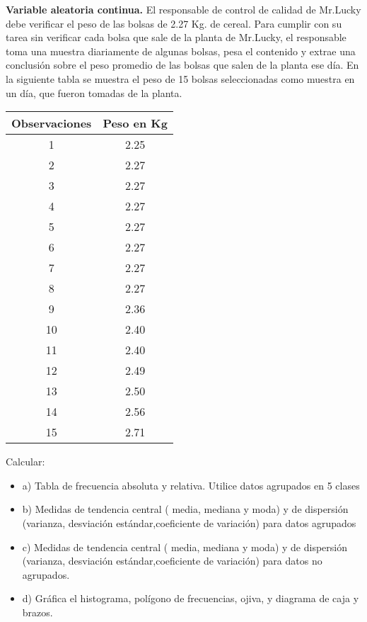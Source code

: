 \documentclass{../oxmathproblems}
\begin{document}
\begin{questions}

\miquestion \textbf{Variable aleatoria continua.}
El responsable de control de calidad de Mr.Lucky debe verificar el peso de las bolsas de 2.27 Kg. de cereal. Para cumplir con su tarea sin verificar cada bolsa que sale de la planta de Mr.Lucky, el responsable toma una muestra diariamente de algunas bolsas, pesa el contenido y extrae una conclusión sobre el peso promedio de las bolsas que salen de la planta ese día. 
En la siguiente tabla se muestra el peso de 15 bolsas seleccionadas como muestra en un día, que fueron tomadas de la planta. 
\begin{center}
\begin{tabular}{ |c|c| } 
 \hline
 \textbf{Observaciones} & \textbf{Peso en Kg} \\ 
 \hline
 1 & 2.25 \\
 2  & 2.27 \\
 3 & 2.27\\ 
 4 & 2.27 \\ 
 5 & 2.27 \\ 
 6 & 2.27 \\ 
 7 & 2.27\\ 
 8 & 2.27 \\ 
 9 & 2.36 \\ 
 10 & 2.40 \\ 
11 & 2.40 \\ 
12 & 2.49 \\
13 & 2.50 \\ 
14 & 2.56 \\ 
15 & 2.71 \\ 
 \hline
\end{tabular}
\end{center}

Calcular: 

\begin{itemize}
\item  a) Tabla de frecuencia absoluta y relativa. Utilice datos agrupados en 5 clases
\item  b) Medidas de tendencia central ( media, mediana y moda) y de dispersión (varianza, desviación estándar,coeficiente de variación) para datos agrupados
\item  c) Medidas de tendencia central ( media, mediana y moda) y de dispersión (varianza, desviación estándar,coeficiente de variación) para datos no agrupados. 
\item d) Gráfica el histograma, polígono de frecuencias, ojiva, y diagrama de caja y brazos. 
\end{itemize}



\end{questions}
\end{document}
